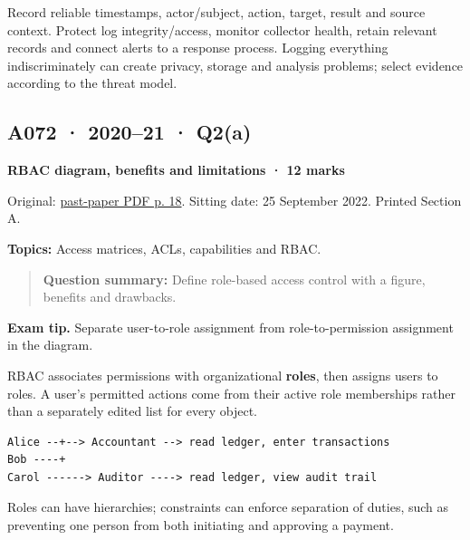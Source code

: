 \documentclass[11pt,a4paper]{article}
\begin{document}
Record reliable timestamps,\allowbreak{} actor/\allowbreak{}subject,\allowbreak{} action,\allowbreak{} target,\allowbreak{} result and source context. Protect log integrity/\allowbreak{}access,\allowbreak{} monitor collector health,\allowbreak{} retain relevant records and connect alerts to a response process. Logging everything indiscriminately can create privacy,\allowbreak{} storage and analysis problems; select evidence according to the threat model.




\clearpage
\subsection{A072 · 2020–21 · Q2(a)}\label{a072}

\textbf{RBAC diagram,\allowbreak{} benefits and limitations · 12 marks}


Original: \href{../../CSE405-Security_Merged.pdf\#page=18}{past-paper PDF p. 18}. Sitting date: 25 September 2022. Printed Section A.


\textbf{Topics:} Access matrices,\allowbreak{} ACLs,\allowbreak{} capabilities and RBAC.



\begin{quote}\small

\textbf{Question summary:} Define role-based access control with a figure,\allowbreak{} benefits and drawbacks.



\end{quote}


{\color{ForestGreen}\textbf{Exam tip.} Separate user-to-role assignment from role-to-permission assignment in the diagram.}


RBAC associates permissions with organizational \textbf{roles},\allowbreak{} then assigns users to roles. A user's permitted actions come from their active role memberships rather than a separately edited list for every object.



\begin{Verbatim}[breaklines=true,breakanywhere=true,fontsize=\small,frame=single,rulecolor=\color{PanelBorder}]
Alice --+--> Accountant --> read ledger, enter transactions
Bob ----+ 
Carol ------> Auditor ----> read ledger, view audit trail
\end{Verbatim}

Roles can have hierarchies; constraints can enforce separation of duties,\allowbreak{} such as preventing one person from both initiating and approving a payment.
\end{document}
